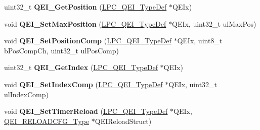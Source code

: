 \begin{DoxyCompactItemize}
\item 
\hypertarget{group___q_e_i___public___functions_ga130ebd94c16dc96da91e4e55397b4da1}{uint32\-\_\-t {\bfseries \-Q\-E\-I\-\_\-\-Get\-Position} (\hyperlink{struct_l_p_c___q_e_i___type_def}{\-L\-P\-C\-\_\-\-Q\-E\-I\-\_\-\-Type\-Def} $\ast$\-Q\-E\-Ix)}\label{group___q_e_i___public___functions_ga130ebd94c16dc96da91e4e55397b4da1}

\item 
\hypertarget{group___q_e_i___public___functions_ga5859611024d75a37a316e9a288b30cb1}{void {\bfseries \-Q\-E\-I\-\_\-\-Set\-Max\-Position} (\hyperlink{struct_l_p_c___q_e_i___type_def}{\-L\-P\-C\-\_\-\-Q\-E\-I\-\_\-\-Type\-Def} $\ast$\-Q\-E\-Ix, uint32\-\_\-t ul\-Max\-Pos)}\label{group___q_e_i___public___functions_ga5859611024d75a37a316e9a288b30cb1}

\item 
\hypertarget{group___q_e_i___public___functions_ga0ab5b2a73f7753e7d608b45850421d3a}{void {\bfseries \-Q\-E\-I\-\_\-\-Set\-Position\-Comp} (\hyperlink{struct_l_p_c___q_e_i___type_def}{\-L\-P\-C\-\_\-\-Q\-E\-I\-\_\-\-Type\-Def} $\ast$\-Q\-E\-Ix, uint8\-\_\-t b\-Pos\-Comp\-Ch, uint32\-\_\-t ul\-Pos\-Comp)}\label{group___q_e_i___public___functions_ga0ab5b2a73f7753e7d608b45850421d3a}

\item 
\hypertarget{group___q_e_i___public___functions_gab67ae861af511ba7e70933f0cd81badc}{uint32\-\_\-t {\bfseries \-Q\-E\-I\-\_\-\-Get\-Index} (\hyperlink{struct_l_p_c___q_e_i___type_def}{\-L\-P\-C\-\_\-\-Q\-E\-I\-\_\-\-Type\-Def} $\ast$\-Q\-E\-Ix)}\label{group___q_e_i___public___functions_gab67ae861af511ba7e70933f0cd81badc}

\item 
\hypertarget{group___q_e_i___public___functions_gaa51242055262f6800664109904a8485e}{void {\bfseries \-Q\-E\-I\-\_\-\-Set\-Index\-Comp} (\hyperlink{struct_l_p_c___q_e_i___type_def}{\-L\-P\-C\-\_\-\-Q\-E\-I\-\_\-\-Type\-Def} $\ast$\-Q\-E\-Ix, uint32\-\_\-t ul\-Index\-Comp)}\label{group___q_e_i___public___functions_gaa51242055262f6800664109904a8485e}

\item 
\hypertarget{group___q_e_i___public___functions_gae45bc2e0ef12c5477edb7ce5338170e8}{void {\bfseries \-Q\-E\-I\-\_\-\-Set\-Timer\-Reload} (\hyperlink{struct_l_p_c___q_e_i___type_def}{\-L\-P\-C\-\_\-\-Q\-E\-I\-\_\-\-Type\-Def} $\ast$\-Q\-E\-Ix, \hyperlink{struct_q_e_i___r_e_l_o_a_d_c_f_g___type}{\-Q\-E\-I\-\_\-\-R\-E\-L\-O\-A\-D\-C\-F\-G\-\_\-\-Type} $\ast$\-Q\-E\-I\-Reload\-Struct)}\label{group___q_e_i___public___functions_gae45bc2e0ef12c5477edb7ce5338170e8}


\end{DoxyCompactItemize}
